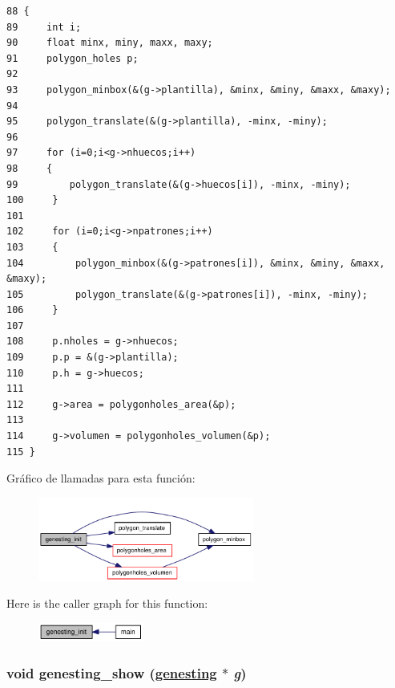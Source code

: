 \begin{Code}\begin{verbatim}88 {
89     int i;
90     float minx, miny, maxx, maxy;
91     polygon_holes p;
92 
93     polygon_minbox(&(g->plantilla), &minx, &miny, &maxx, &maxy);
94 
95     polygon_translate(&(g->plantilla), -minx, -miny);
96 
97     for (i=0;i<g->nhuecos;i++)
98     {
99         polygon_translate(&(g->huecos[i]), -minx, -miny);
100     }
101 
102     for (i=0;i<g->npatrones;i++)
103     {
104         polygon_minbox(&(g->patrones[i]), &minx, &miny, &maxx, &maxy);
105         polygon_translate(&(g->patrones[i]), -minx, -miny);
106     }
107 
108     p.nholes = g->nhuecos;
109     p.p = &(g->plantilla);
110     p.h = g->huecos;
111 
112     g->area = polygonholes_area(&p);
113 
114     g->volumen = polygonholes_volumen(&p);
115 }
\end{verbatim}\end{Code}




Gr\'{a}fico de llamadas para esta funci\'{o}n:\begin{figure}[H]
\begin{center}
\leavevmode
\includegraphics[width=201pt]{group__genetic_g1daa6a4e8af34b8b16a48fc2f3701f1c_g1daa6a4e8af34b8b16a48fc2f3701f1c_cgraph}
\end{center}
\end{figure}


Here is the caller graph for this function:\begin{figure}[H]
\begin{center}
\leavevmode
\includegraphics[width=98pt]{group__genetic_g1daa6a4e8af34b8b16a48fc2f3701f1c_g1daa6a4e8af34b8b16a48fc2f3701f1c_icgraph}
\end{center}
\end{figure}
\hypertarget{group__genetic_g3f63f4034274d731cb3fdf3200c64d41_g3f63f4034274d731cb3fdf3200c64d41}{
\subsubsection[genesting\_\-show]{\setlength{\rightskip}{0pt plus 5cm}void genesting\_\-show (\hyperlink{struct__genesting}{genesting} $\ast$ {\em g})}}
\label{group__genetic_g3f63f4034274d731cb3fdf3200c64d41_g3f63f4034274d731cb3fdf3200c64d41}


